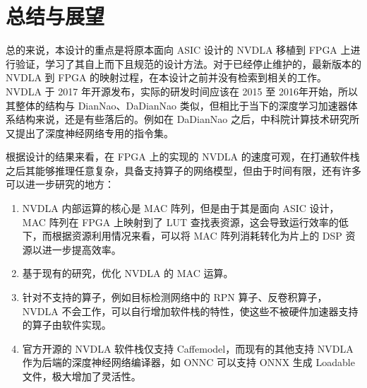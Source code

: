 \chapter{总结与展望}\label{chap:conclusion}

总的来说，本设计的重点是将原本面向 ASIC 设计的 NVDLA 移植到 FPGA 上进行验证，学习了其自上而下且规范的设计方法。对于已经停止维护的，最新版本的 NVDLA 到 FPGA 的映射过程，在本设计之前并没有检索到相关的工作。NVDLA 于 2017 年开源发布，实际的研发时间应该在 2015 至 2016年开始，所以其整体的结构与 DianNao、DaDianNao 类似，但相比于当下的深度学习加速器体系结构来说，还是有些落后的。例如在 DaDianNao 之后，中科院计算技术研究所又提出了深度神经网络专用的指令集\cite{7551409}。

根据设计的结果来看，在 FPGA 上的实现的 NVDLA 的速度可观，在打通软件栈之后其能够推理任意复杂，具备支持算子的网络模型，但由于时间有限，还有许多可以进一步研究的地方：

\begin{enumerate}
    \item NVDLA 内部运算的核心是 MAC 阵列，但是由于其是面向 ASIC 设计，MAC 阵列在 FPGA 上映射到了 LUT 查找表资源，这会导致运行效率的低下，而根据资源利用情况来看，可以将 MAC 阵列消耗转化为片上的 DSP 资源以进一步提高效率。
    \item 基于现有的研究\cite{祁琛2018应用于神经网络的高效能计算单元的研究与实现}，优化 NVDLA 的 MAC 运算。
    \item 针对不支持的算子，例如目标检测网络中的 RPN 算子、反卷积算子，NVDLA 不会工作，可以自行增加软件栈的特性，使这些不被硬件加速器支持的算子由软件实现。
    \item 官方开源的 NVDLA 软件栈仅支持 Caffemodel，而现有的其他支持 NVDLA 作为后端的深度神经网络编译器，如 ONNC 可以支持 ONNX 生成 Loadable 文件，极大增加了灵活性。
\end{enumerate}
